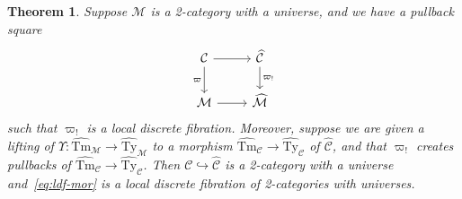 \documentclass[10pt]{article}
\newtheorem{theorem}{Theorem}
\theoremstyle{definition}
\newcommand\M{\mathcal{M}}
\newcommand\Mhat{\widehat{\mathcal{M}}}
\newcommand\Mtyhat{{\widehat{\mathrm{Ty}}_{\M}}}
\newcommand\Mtmhat{{\widehat{\mathrm{Tm}}_{\M}}}
\newcommand\Upshat{{\widehat{\Upsilon}}}
\newcommand\C{\mathcal{C}}
\newcommand\Chat{{\widehat{\mathcal{C}}}}
\newcommand\Ctyhat{{\widehat{\mathrm{Ty}}}_{\C}}
\newcommand\Ctmhat{{\widehat{\mathrm{Tm}}}_{\C}}
\newcommand\vp{\varpi}
\newcommand\vpsh{\vp_!}
\begin{document}
\begin{theorem}\label{thm:ldf-lift}
  Suppose $\M$ is a 2-category with a universe, and we have a pullback square
  \begin{equation}\label{eq:ldf-mor}
    \begin{tikzcd}
      \C \ar[r] \ar[d,"\vp"'] & \Chat \ar[d,"\vpsh"] \\
      \M \ar[r] & \Mhat
    \end{tikzcd}
  \end{equation}
  such that $\vpsh$ is a local discrete fibration.
  Moreover, suppose we are given a lifting of $\Upshat : \Mtmhat \to \Mtyhat$ to a morphism $\Ctmhat \to \Ctyhat$ of $\Chat$, and that $\vpsh$ creates pullbacks of $\Ctmhat \to \Ctyhat$.
  Then $\C\hookrightarrow\Chat$ is a 2-category with a universe and~\eqref{eq:ldf-mor} is a local discrete fibration of 2-categories with universes.
\end{theorem}
\end{document}
